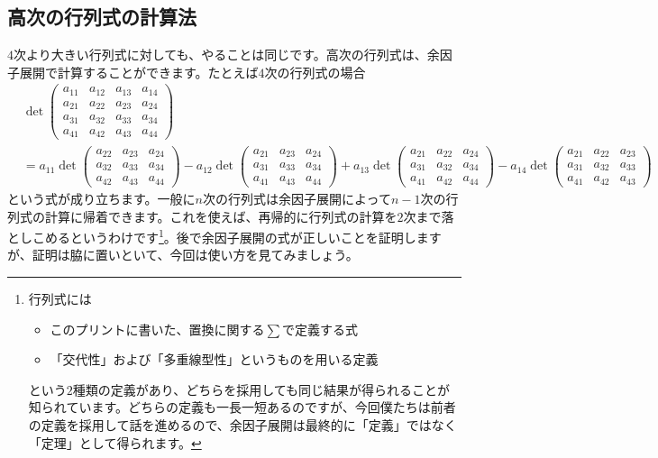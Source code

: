 \subsection{高次の行列式の計算法}

$4$次より大きい行列式に対しても、やることは同じです。高次の行列式は、余因子展開で計算することができます。たとえば$4$次の行列式の場合
\begin{align*}
&\det
\begin{pmatrix}
a_{11} & a_{12} & a_{13} & a_{14} \\
a_{21} & a_{22} & a_{23} & a_{24} \\
a_{31} & a_{32} & a_{33} & a_{34} \\
a_{41} & a_{42} & a_{43} & a_{44}
\end{pmatrix} \\
&= a_{11} \det
\begin{pmatrix}
a_{22} & a_{23} & a_{24} \\
a_{32} & a_{33} & a_{34} \\
a_{42} & a_{43} & a_{44}
\end{pmatrix}
- a_{12} \det
\begin{pmatrix}
a_{21} & a_{23} & a_{24} \\
a_{31} & a_{33} & a_{34} \\
a_{41} & a_{43} & a_{44}
\end{pmatrix}
+ a_{13} \det
\begin{pmatrix}
a_{21} & a_{22} & a_{24} \\
a_{31} & a_{32} & a_{34} \\
a_{41} & a_{42} & a_{44}
\end{pmatrix}
- a_{14} \det
\begin{pmatrix}
a_{21} & a_{22} & a_{23} \\
a_{31} & a_{32} & a_{33} \\
a_{41} & a_{42} & a_{43}
\end{pmatrix}
\end{align*}
という式が成り立ちます。一般に$n$次の行列式は余因子展開によって$n - 1$次の行列式の計算に帰着できます。これを使えば、再帰的に行列式の計算を$2$次まで落としこめるというわけです\footnote{行列式には
\begin{itemize}
\item このプリントに書いた、置換に関する$\sum$で定義する式
\item 「交代性」および「多重線型性」というものを用いる定義
\end{itemize}
という$2$種類の定義があり、どちらを採用しても同じ結果が得られることが知られています。どちらの定義も一長一短あるのですが、今回僕たちは前者の定義を採用して話を進めるので、余因子展開は最終的に「定義」ではなく「定理」として得られます。}。後で余因子展開の式が正しいことを証明しますが、証明は脇に置いといて、今回は使い方を見てみましょう。

